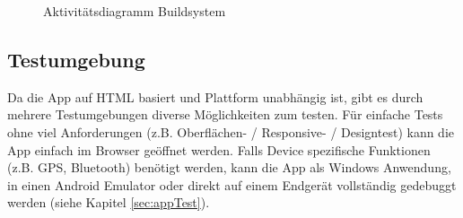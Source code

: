 \begin{figure}[H]
  \begin{center}
    \label{fig:appBuildsystemAktivitatsdiagrammDebug}
	\label{fig:appBuildsystemAktivitatsdiagrammWatch}
	\caption{Aktivitätsdiagramm Buildsystem}
	\label{fig:appBuildsystemAktivitatsdiagramm}
  \end{center}
\end{figure}

\subsection{Testumgebung}

Da die App auf HTML basiert und Plattform unabhängig ist, gibt es durch mehrere Testumgebungen diverse Möglichkeiten zum testen. Für einfache Tests ohne viel Anforderungen (z.B. Oberflächen- / Responsive- / Designtest) kann die App einfach im Browser geöffnet werden. Falls Device spezifische Funktionen (z.B. GPS, Bluetooth) benötigt werden, kann die App als Windows Anwendung, in einen Android Emulator oder direkt auf einem Endgerät vollständig gedebuggt werden (siehe Kapitel \ref{sec:appTest}). 

